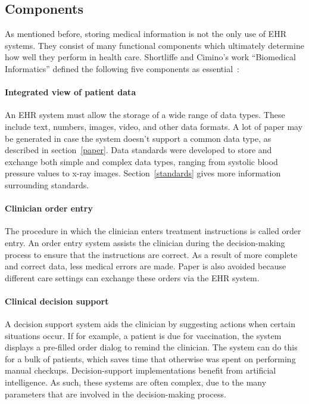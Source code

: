     \subsection{Components}\label{components}

    As mentioned before, storing medical information is not the only use of EHR systems. They consist of many functional components which ultimately determine how well they perform in health care. Shortliffe and Cimino's work ``Biomedical Informatics'' defined the following five components as essential~\cite{Shortliffe2014}:\@\paragraph{Integrated view of patient data} An EHR system must allow the storage of a wide range of data types. These include text, numbers, images, video, and other data formats. A lot of paper may be generated in case the system doesn't support a common data type, as described in section~\ref{paper}. Data standards were developed to store and exchange both simple and complex data types, ranging from systolic blood pressure values to x-ray images. Section~\ref{standards} gives more information surrounding standards.

    \paragraph{Clinician order entry} The procedure in which the clinician enters treatment instructions is called order entry. An order entry system assists the clinician during the decision-making process to ensure that the instructions are correct. As a result of more complete and correct data, less medical errors are made. Paper is also avoided because different care settings can exchange these orders via the EHR system.

    \paragraph{Clinical decision support} A decision support system aids the clinician by suggesting actions when certain situations occur. If for example, a patient is due for vaccination, the system displays a pre-filled order dialog to remind the clinician. The system can do this for a bulk of patients, which saves time that otherwise was spent on performing manual checkups. Decision-support implementations benefit from artificial intelligence. As such, these systems are often complex, due to the many parameters that are involved in the decision-making process.

